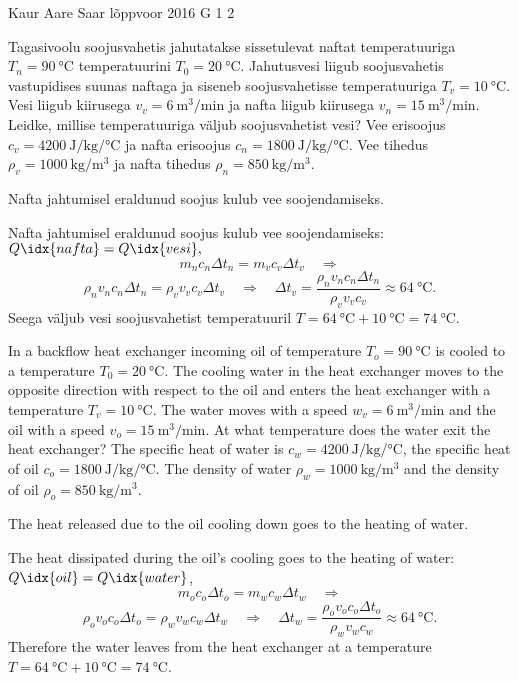 {Kaur Aare Saar} %
{lõppvoor} %
{2016} %
{G 1} %
{2} %
{
\ifStatement
Tagasivoolu soojusvahetis jahutatakse sissetulevat naftat temperatuuriga $T_{n}=\SI{90}{\celsius}$ temperatuurini $T_{0}=\SI{20}{\celsius}$. 
Jahutusvesi liigub soojusvahetis vastupidises suunas naftaga ja siseneb soojusvahetisse temperatuuriga $T_{v}=\SI{10}{\celsius}$.
Vesi liigub kiirusega $v_{v}=\SI{6}{\m^3\per\minute}$ 
ja nafta liigub kiirusega $v_{n}=\SI{15}{\m^3\per\minute}$. 
Leidke, millise temperatuuriga väljub soojusvahetist vesi? Vee erisoojus $c_{v}=\SI{4200}{\joule\per\kilogram\per\celsius}$ 
ja nafta erisoojus $c_{n}=\SI{1800}{\joule\per\kilogram\per\celsius}$. Vee tihedus $\rho_{v}=\SI{1000}{\kilogram\per\metre\cubed}$ ja nafta tihedus $\rho_{n}=\SI{850}{\kilogram\per\metre\cubed}$.
\fi


\ifHint
Nafta jahtumisel eraldunud soojus kulub vee soojendamiseks.
\fi


\ifSolution
Nafta jahtumisel eraldunud soojus kulub vee soojendamiseks: $Q\idx{nafta} = Q\idx{vesi},$
\[ m_nc_n\Delta t_n = m_vc_v\Delta t_v \quad\Rightarrow \]
\[ \rho_nv_nc_n\Delta t_n = \rho_v v_vc_v\Delta t_v \quad\Rightarrow\quad \Delta t_v = \frac{\rho_nv_nc_n\Delta t_n}{\rho_vv_vc_v} \approx \SI{64}{\celsius}. \]
Seega väljub vesi soojusvahetist temperatuuril $T = \SI{64}{\celsius} + \SI{10}{\celsius} = \SI{74}{\celsius}$.
\fi


\ifEngStatement
In a backflow heat exchanger incoming oil of temperature $T_{o}=\SI{90}{\celsius}$ is cooled to a temperature $T_{0}=\SI{20}{\celsius}$. The cooling water in the heat exchanger moves to the opposite direction with respect to the oil and enters the heat exchanger with a temperature $T_{v}=\SI{10}{\celsius}$. The water moves with a speed $w_{v}=\SI{6}{\m^3\per\minute}$ and the oil with a speed $v_{o}=\SI{15}{\m^3\per\minute}$. At what temperature does the water exit the heat exchanger? The specific heat of water is $c_{w}=\SI{4200}{\joule\per\kilogram\per\celsius}$, the specific heat of oil $c_{o}=\SI{1800}{\joule\per\kilogram\per\celsius}$. The density of water $\rho_{w}=\SI{1000}{\kilogram\per\metre\cubed}$ and the density of oil $\rho_{o}=\SI{850}{\kilogram\per\metre\cubed}$.
\fi


\ifEngHint
The heat released due to the oil cooling down goes to the heating of water.
\fi


\ifEngSolution
The heat dissipated during the oil's cooling goes to the heating of water: $Q\idx{oil} = Q\idx{water}$,
\[ m_oc_o\Delta t_o = m_wc_w\Delta t_w \quad\Rightarrow \]
\[ \rho_ov_oc_o\Delta t_o = \rho_w v_wc_w\Delta t_w \quad\Rightarrow\quad \Delta t_w = \frac{\rho_ov_oc_o\Delta t_o}{\rho_wv_wc_w} \approx \SI{64}{\celsius}.  \]
Therefore the water leaves from the heat exchanger at a temperature $T = \SI{64}{\celsius} + \SI{10}{\celsius} = \SI{74}{\celsius}$.
\fi
}